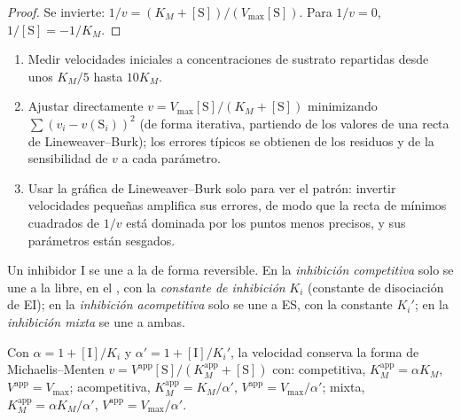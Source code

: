 \begin{proof}
Se invierte: $1/v = (K_M + [\mathrm S])/(V_{\max}[\mathrm S])$. Para $1/v = 0$, $1/[\mathrm S] = -1/K_M$.
\end{proof}

\begin{method}\label{met:b3:complex-kinetics:mm-fit}
\begin{enumerate}
  \item Medir velocidades iniciales a concentraciones de sustrato repartidas desde unos
        $K_M/5$ hasta $10K_M$.
  \item Ajustar directamente $v = V_{\max}[\mathrm S]/(K_M + [\mathrm S])$ minimizando $\sum(v_i - v(\mathrm S_i))^2$ (de forma iterativa,
        partiendo de los valores de una recta de Lineweaver--Burk); los errores
        típicos se obtienen de los residuos y de la sensibilidad de $v$ a cada
        parámetro.
  \item Usar la gráfica de Lineweaver--Burk solo para ver el patrón: invertir velocidades
        pequeñas amplifica sus errores, de modo que la recta de mínimos cuadrados de $1/v$
        está dominada por los puntos menos precisos, y sus parámetros están
        sesgados.
\end{enumerate}
\end{method}

\begin{definition}[Inhibición]\label{def:b3:complex-kinetics:inhibition}
Un inhibidor I se une a la  de forma reversible. En la \emph{inhibición
competitiva} solo se une a la  libre, en el
, con la \emph{constante de inhibición} $K_i$
(constante de disociación de EI); en la \emph{inhibición acompetitiva}
solo se une a ES, con la constante $K_i'$; en la \emph{inhibición
mixta} se une a ambas.
\end{definition}

\begin{proposition}\label{prop:b3:complex-kinetics:inhibition-laws}
Con $\alpha = 1 + [\mathrm I]/K_i$ y $\alpha' = 1 + [\mathrm I]/K_i'$, la velocidad conserva la
forma de Michaelis--Menten $v = V^{\mathrm{app}}[\mathrm S]/(K_M^{\mathrm{app}} + [\mathrm S])$ con: competitiva,
$K_M^{\mathrm{app}} = \alpha K_M$, $V^{\mathrm{app}} = V_{\max}$; acompetitiva, $K_M^{\mathrm{app}} = K_M/\alpha'$, $V^{\mathrm{app}} =
V_{\max}/\alpha'$; mixta, $K_M^{\mathrm{app}} = \alpha K_M/\alpha'$, $V^{\mathrm{app}} = V_{\max}/\alpha'$.
\end{proposition}

